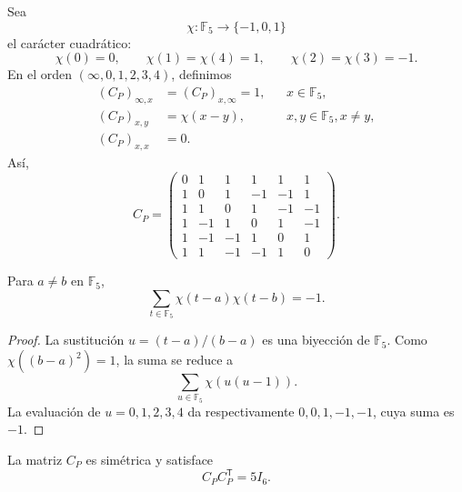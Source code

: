 Sea
\[
 \chi:\mathbb F_5\longrightarrow\{-1,0,1\}
\]
el carácter cuadrático:
\[
 \chi(0)=0,
 \qquad
 \chi(1)=\chi(4)=1,
 \qquad
 \chi(2)=\chi(3)=-1.
\]
En el orden \((\infty,0,1,2,3,4)\), definimos
\begin{align}
 (C_P)_{\infty,x}&=(C_P)_{x,\infty}=1,
 &&x\in\mathbb F_5,\label{p12-83-c20-s1:eq:paley-fila-infinito}\\
 (C_P)_{x,y}&=\chi(x-y),
 &&x,y\in\mathbb F_5, x\neq y,\label{p12-83-c20-s1:eq:paley-entradas-finitas}\\
 (C_P)_{x,x}&=0.
 \label{p12-83-c20-s1:eq:paley-diagonal}
\end{align}
Así,
\begin{equation}
 C_P=
 \begin{pmatrix}
 0& 1& 1& 1& 1& 1\\
 1& 0& 1&-1&-1& 1\\
 1& 1& 0& 1&-1&-1\\
 1&-1& 1& 0& 1&-1\\
 1&-1&-1& 1& 0& 1\\
 1& 1&-1&-1& 1& 0
 \end{pmatrix}.
 \label{p12-83-c20-s1:eq:matriz-conferencia-paley-autonoma}
\end{equation}

\begin{lemma}
\label{p12-83-c20-s1:lem:correlacion-cuadratica-f5}
Para \(a\neq b\) en \(\mathbb F_5\),
\begin{equation}
 \sum_{t\in\mathbb F_5}
 \chi(t-a)\chi(t-b)=-1.
 \label{p12-83-c20-s1:eq:correlacion-cuadratica-f5}
\end{equation}
\end{lemma}

\begin{proof}
La sustitución \(u=(t-a)/(b-a)\) es una biyección de \(\mathbb F_5\).
Como \(\chi((b-a)^2)=1\), la suma se reduce a
\[
 \sum_{u\in\mathbb F_5}\chi(u(u-1)).
\]
La evaluación de \(u=0,1,2,3,4\) da respectivamente
\(0,0,1,-1,-1\), cuya suma es \(-1\).
\end{proof}

\begin{proposition}
\label{p12-83-c20-s1:prop:paley-identidad-conferencia-autonoma}
La matriz \(C_P\) es simétrica y satisface
\begin{equation}
 \boxed{C_PC_P^{\mathsf T}=5I_6.}
 \label{p12-83-c20-s1:eq:paley-identidad-conferencia-autonoma}
\end{equation}
\end{proposition}

